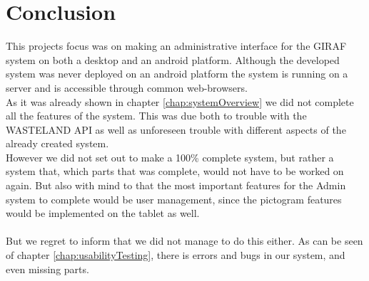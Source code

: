 \chapter{Conclusion}
\label{chap:conclusion}
This projects focus was on making an administrative interface for the GIRAF system on both a desktop and an android platform. Although the developed system was never deployed on an android platform the system is running on a server and is accessible through common web-browsers.\\
As it was already shown in chapter \vref{chap:systemOverview} we did not complete all the features of the system. This was due both to trouble with the WASTELAND API as well as unforeseen trouble with different aspects of the already created system.\\
However we did not set out to make a 100\% complete system, but rather a system that, which parts that was complete, would not have to be worked on again. But also with mind to that the most important features for the Admin system to complete would be user management, since the pictogram features would be implemented on the tablet as well.\\
\\
But we regret to inform that we did not manage to do this either. As can be seen of chapter \vref{chap:usabilityTesting}, there is errors and bugs in our system, and even missing parts.\\
\\

